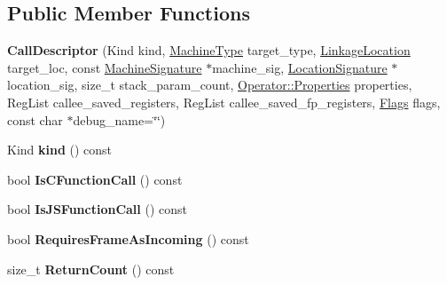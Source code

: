 \subsection*{Public Member Functions}
\begin{DoxyCompactItemize}
\item 
{\bfseries Call\+Descriptor} (Kind kind, \hyperlink{classv8_1_1internal_1_1_machine_type}{Machine\+Type} target\+\_\+type, \hyperlink{classv8_1_1internal_1_1compiler_1_1_linkage_location}{Linkage\+Location} target\+\_\+loc, const \hyperlink{classv8_1_1internal_1_1_signature}{Machine\+Signature} $\ast$machine\+\_\+sig, \hyperlink{classv8_1_1internal_1_1_signature}{Location\+Signature} $\ast$location\+\_\+sig, size\+\_\+t stack\+\_\+param\+\_\+count, \hyperlink{classv8_1_1base_1_1_flags}{Operator\+::\+Properties} properties, Reg\+List callee\+\_\+saved\+\_\+registers, Reg\+List callee\+\_\+saved\+\_\+fp\+\_\+registers, \hyperlink{classv8_1_1base_1_1_flags}{Flags} flags, const char $\ast$debug\+\_\+name=\char`\"{}\char`\"{})\hypertarget{classv8_1_1internal_1_1compiler_1_1_call_descriptor_a78694d2f2421f22f1d65cf0901e9685c}{}\label{classv8_1_1internal_1_1compiler_1_1_call_descriptor_a78694d2f2421f22f1d65cf0901e9685c}

\item 
Kind {\bfseries kind} () const \hypertarget{classv8_1_1internal_1_1compiler_1_1_call_descriptor_a8cec3c53c13ed87e847783d71c127642}{}\label{classv8_1_1internal_1_1compiler_1_1_call_descriptor_a8cec3c53c13ed87e847783d71c127642}

\item 
bool {\bfseries Is\+C\+Function\+Call} () const \hypertarget{classv8_1_1internal_1_1compiler_1_1_call_descriptor_abf74f46c9e5c462383361218e909c541}{}\label{classv8_1_1internal_1_1compiler_1_1_call_descriptor_abf74f46c9e5c462383361218e909c541}

\item 
bool {\bfseries Is\+J\+S\+Function\+Call} () const \hypertarget{classv8_1_1internal_1_1compiler_1_1_call_descriptor_a5c940f5e6ae6955d9958cbc6333f8bc0}{}\label{classv8_1_1internal_1_1compiler_1_1_call_descriptor_a5c940f5e6ae6955d9958cbc6333f8bc0}

\item 
bool {\bfseries Requires\+Frame\+As\+Incoming} () const \hypertarget{classv8_1_1internal_1_1compiler_1_1_call_descriptor_a1a59e365b233f4ec14f43208b25d5dc0}{}\label{classv8_1_1internal_1_1compiler_1_1_call_descriptor_a1a59e365b233f4ec14f43208b25d5dc0}

\item 
size\+\_\+t {\bfseries Return\+Count} () const \hypertarget{classv8_1_1internal_1_1compiler_1_1_call_descriptor_acaceed1803274780f8d4491ab07af385}{}\label{classv8_1_1internal_1_1compiler_1_1_call_descriptor_acaceed1803274780f8d4491ab07af385}


\end{DoxyCompactItemize}
